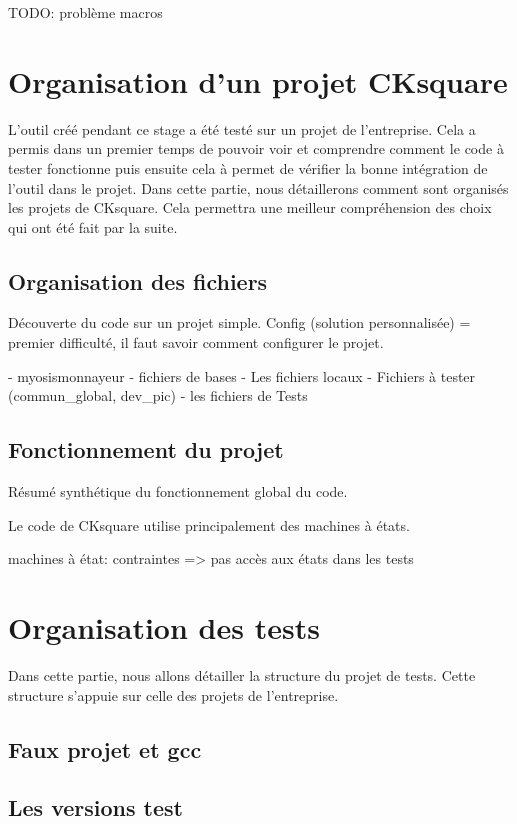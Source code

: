 \documentclass[a4paper]{article}
\begin{document}
TODO: problème macros

\section{Organisation d'un projet CKsquare}

L'outil créé pendant ce stage a été testé sur un projet de l'entreprise. Cela a
permis dans un premier temps de pouvoir voir et comprendre comment le code à
tester fonctionne puis ensuite cela à permet de vérifier la bonne intégration de
l'outil dans le projet. Dans cette partie, nous détaillerons comment sont
organisés les projets de CKsquare. Cela permettra une meilleur compréhension des
choix qui ont été fait par la suite.

\subsection{Organisation des fichiers}

Découverte du code sur un projet simple.
Config (solution personnalisée) = premier difficulté, il faut savoir comment
configurer le projet.

- myosismonnayeur
- fichiers de bases
  - Les fichiers locaux
  - Fichiers à tester (commun\_global, dev\_pic)
- les fichiers de Tests

\subsection{Fonctionnement du projet}

Résumé synthétique du fonctionnement global du code.

Le code de CKsquare utilise principalement des machines à états.

machines à état:
contraintes => pas accès aux états dans les tests

\section{Organisation des tests}

Dans cette partie, nous allons détailler la structure du projet de tests. Cette
structure s'appuie sur celle des projets de l'entreprise.

\subsection{Faux projet et gcc}

\subsection{Les versions test}
\end{document}
